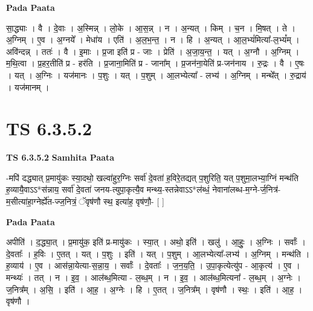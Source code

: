 \documentclass[17pt]{extarticle}
\begin{document}
\textbf{Pada Paata} \newline

सा॒द्ध्याः । वै । दे॒वाः । अ॒स्मिन्न् । लो॒के । आ॒स॒न्न् । न । अ॒न्यत् । किम् । च॒न । मि॒षत् । ते । अ॒ग्निम् । ए॒व । अ॒ग्नये᳚ । मेधा॑य । एति॑ । अ॒ल॒भ॒न्त॒ । न । हि । अ॒न्यत् । आ॒ल॒भ्यं॑मित्या᳚-ल॒भ्यं᳚म् । अवि॑न्दन्न् । ततः॑ । वै । इ॒माः । प्र॒जा इति॑ प्र - जाः । प्रेति॑ । अ॒जा॒य॒न्त॒ । यत् । अ॒ग्नौ । अ॒ग्निम् । म॒थि॒त्वा । प्र॒हर॒तीति॑ प्र - हर॑ति । प्र॒जाना॒मिति॑ प्र - जाना᳚म् । प्र॒जन॑ना॒येति॑ प्र-जन॑नाय । रु॒द्रः । वै । ए॒षः । यत् । अ॒ग्निः । यज॑मानः । प॒शुः । यत् । प॒शुम् । आ॒लभ्येत्या᳚ - लभ्य॑ । अ॒ग्निम् । मन्थे᳚त् । रु॒द्राय॑ । यज॑मानम् ।  \newline




\section*{ TS 6.3.5.2 }

\textbf{TS 6.3.5.2 } \newline
\textbf{Samhita Paata} \newline

-मपि॑ दद्ध्यात् प्र॒मायु॑कः स्या॒दथो॒ खल्वा॑हुर॒ग्निः सर्वा॑ दे॒वता॑ ह॒विरे॒तद्यत् प॒शुरिति॒ यत् प॒शुमा॒लभ्या॒ग्निं मन्थ॑ति ह॒व्यायै॒वाऽऽ*स॑न्नाय॒ सर्वा॑ दे॒वता॑ जनय-त्युपा॒कृत्यै॒व मन्थ्य॒-स्तन्नेवाऽऽ*ल॑ब्धं॒ नेवाना॑लब्ध-म॒ग्ने-र्ज॒नित्र॑-म॒सीत्या॑हा॒ग्नेर्ह्ये॑त-ज्ज॒नित्रं॒ ॅवृष॑णौ स्थ॒ इत्या॑ह॒ वृष॑णौ॒- [  ] \newline

\textbf{Pada Paata} \newline

अपीति॑ । द॒द्ध्या॒त् । प्र॒मायु॑क॒ इति॑ प्र-मायु॑कः । स्या॒त् । अथो॒ इति॑ । खलु॑ । आ॒हुः॒ । अ॒ग्निः । सर्वाः᳚ । दे॒वताः᳚ । ह॒विः । ए॒तत् । यत् । प॒शुः । इति॑ । यत् । प॒शुम् । आ॒लभ्येत्या᳚-लभ्य॑ । अ॒ग्निम् । मन्थ॑ति । ह॒व्याय॑ । ए॒व । आस॑न्ना॒येत्या-स॒न्ना॒य॒ । सर्वाः᳚ । दे॒वताः᳚ । ज॒न॒य॒ति॒ । उ॒पा॒कृत्येत्यु॑प - आ॒कृत्य॑ । ए॒व । मन्थ्यः॑ । तत् । न । इ॒व॒ । आल॑ब्ध॒मित्या - ल॒ब्ध॒म् । न । इ॒व॒ । आल॑ब्ध॒मित्यना᳚ - ल॒ब्ध॒म् । अ॒ग्नेः । ज॒नित्र᳚म् । अ॒सि॒ । इति॑ । आ॒ह॒ । अ॒ग्नेः । हि । ए॒तत् । ज॒नित्र᳚म् । वृष॑णौ । स्थः॒ । इति॑ । आ॒ह॒ । वृष॑णौ ।  \newline




\end{document}
